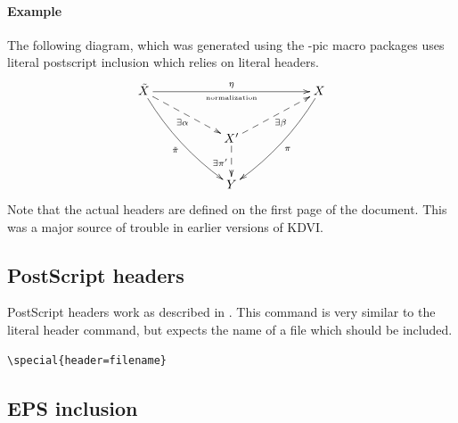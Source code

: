 \documentclass{article}
\begin{document}
\paragraph*{Example}
The following diagram, which was generated using the \Xy -pic macro
packages uses literal postscript inclusion which relies on literal
headers.
$$
\xymatrix{ {\tilde X}
  \ar@{-->}[rrd]_{\exists \alpha} \ar[rrrr]^{\eta}_{\txt{\tiny
      normalization}} \ar@/_/ [rrdd]_ {\tilde \pi} & & & & {X}
  \ar@/^/[lldd]^{\pi}  \\ & & {X'}
  \ar@{-->}[rru]_{\exists \beta} \ar@{-->}[d]_{\exists \pi'} & & \\ & &
  {Y}& &}
$$
Note that the actual headers are defined on the first page of the
document. This was a major source of trouble in earlier versions of
KDVI.



\subsection{PostScript headers}

PostScript headers work as described in \cite{dvips}. This command is
very similar to the literal header command, but expects the name of a
file which should be included.
\begin{verbatim}
\special{header=filename}
\end{verbatim}




\subsection{EPS inclusion}\label{chap:eps}
\end{document}
